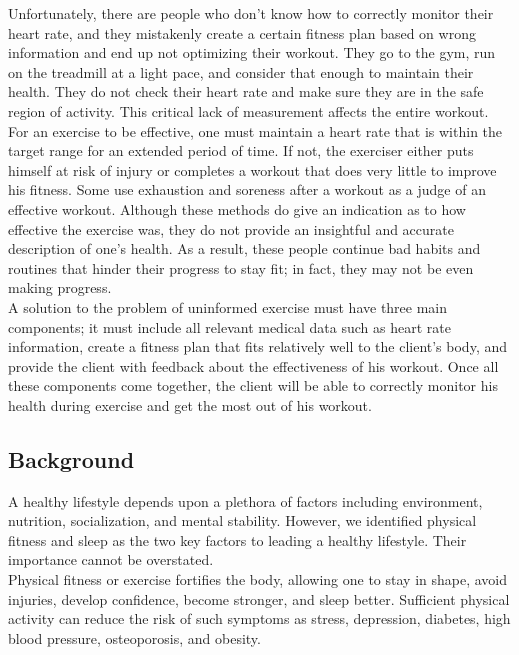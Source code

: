 \documentclass[letterpaper,english, 12pt]{scrreprt}
\begin{document}
Unfortunately, there are people who don't know how to correctly monitor their heart rate, and they mistakenly create a certain fitness plan based on wrong information and end up not optimizing their workout. They go to the gym, run on the treadmill at a light pace, and consider that enough to maintain their health. They do not check their heart rate and make sure they are in the safe region of activity. This critical lack of measurement affects the entire workout. For an exercise to be effective, one must maintain a heart rate that is within the target range for an extended period of time. If not, the exerciser either puts himself at risk of injury or completes a workout that does very little to improve his fitness. Some use exhaustion and soreness after a workout as a judge of an effective workout. Although these methods do give an indication as to how effective the exercise was, they do not provide an insightful and accurate description of one's health. As a result, these people continue bad habits and routines that hinder their progress to stay fit; in fact, they may not be even making progress.\\
 
A solution to the problem of uninformed exercise must have three main components; it must include all relevant medical data such as heart rate information, create a fitness plan that fits relatively well to the client's body, and provide the client with feedback about the effectiveness of his workout. Once all these components come together, the client will be able to correctly monitor his health during exercise and get the most out of his workout.\\
 
\subsection{Background}
A healthy lifestyle depends upon a plethora of factors including environment, nutrition, socialization, and mental stability. However, we identified physical fitness and sleep as the two key factors to leading a healthy lifestyle. Their importance cannot be overstated.\\
 
Physical fitness or exercise fortifies the body, allowing one to stay in shape, avoid injuries, develop confidence, become stronger, and sleep better. Sufficient physical activity can reduce the risk of such symptoms as stress, depression, diabetes, high blood pressure, osteoporosis, and obesity.\\
 
\end{document}
